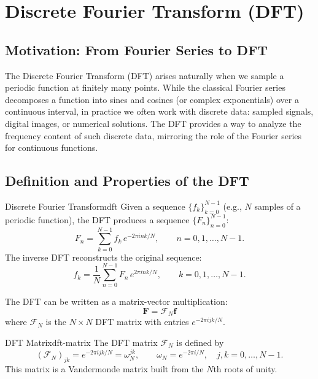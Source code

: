\section{Discrete Fourier Transform (DFT)}

\subsection{Motivation: From Fourier Series to DFT}
The Discrete Fourier Transform (DFT) arises naturally when we sample a periodic function at finitely many points. While the classical Fourier series decomposes a function into sines and cosines (or complex exponentials) over a continuous interval, in practice we often work with discrete data: sampled signals, digital images, or numerical solutions. The DFT provides a way to analyze the frequency content of such discrete data, mirroring the role of the Fourier series for continuous functions.

\subsection{Definition and Properties of the DFT}
\begin{definition}{Discrete Fourier Transform}{dft}
    Given a sequence $\{f_k\}_{k=0}^{N-1}$ (e.g., $N$ samples of a periodic function), the DFT produces a sequence $\{F_n\}_{n=0}^{N-1}$:
    \begin{equation}
        F_n = \sum_{k=0}^{N-1} f_k \, e^{-2\pi i n k / N}, \qquad n = 0, 1, \ldots, N-1.
    \end{equation}
    The inverse DFT reconstructs the original sequence:
    \begin{equation}
        f_k = \frac{1}{N} \sum_{n=0}^{N-1} F_n \, e^{2\pi i n k / N}, \qquad k = 0, 1, \ldots, N-1.
    \end{equation}
\end{definition}

The DFT can be written as a matrix-vector multiplication:
\begin{equation}
    \mathbf{F} = \mathcal{F}_N \mathbf{f}
\end{equation}
where $\mathcal{F}_N$ is the $N \times N$ DFT matrix with entries $e^{-2\pi i jk / N}$.

\begin{definition}{DFT Matrix}{dft-matrix}
    The DFT matrix $\mathcal{F}_N$ is defined by
    \begin{equation}
        (\mathcal{F}_N)_{jk} = e^{-2\pi i jk / N} = \omega_N^{jk}, \qquad \omega_N = e^{-2\pi i / N}, \quad j, k = 0, \ldots, N-1.
    \end{equation}
    This matrix is a Vandermonde matrix built from the $N$th roots of unity.
\end{definition}

